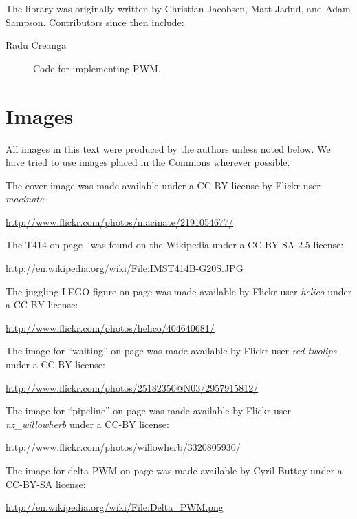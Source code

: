 The \plumbing library was originally written by Christian Jacobsen, Matt Jadud, and Adam Sampson. Contributors since then include:

\begin{description}
	\item[Radu Creanga] Code for implementing PWM.
\end{description}

\newpage

\section{Images}
All images in this text were produced by the authors unless noted below. We have tried to use images placed in the Commons wherever possible.

The cover image was made available under a CC-BY license by Flickr user {\em macinate}:

\small{\url{http://www.flickr.com/photos/macinate/2191054677/}}

The T414 on page~\pageref{image:t414} was found on the Wikipedia under a CC-BY-SA-2.5 license:

\small{\url{http://en.wikipedia.org/wiki/File:IMST414B-G20S.JPG}}

The juggling LEGO figure on page \pageref{image:juggling} was made available by Flickr user {\em helico} under a CC-BY license:

\small{\url{http://www.flickr.com/photos/helico/404640681/}}

The image for ``waiting'' on page \pageref{medio:waiting} was made available by Flickr user {\em red twolips} under a CC-BY license:

\small{\url{http://www.flickr.com/photos/25182350@N03/2957915812/}}

The image for ``pipeline'' on page \pageref{image:scotland-pipeline} was made available by Flickr user {\em nz\_willowherb} under a CC-BY license:

\small{\url{http://www.flickr.com/photos/willowherb/3320805930/}}

The image for delta PWM on page \pageref{image:ch7-delta-pwm} was made available by Cyril Buttay under a CC-BY-SA license:

\small{\url{http://en.wikipedia.org/wiki/File:Delta_PWM.png}}

